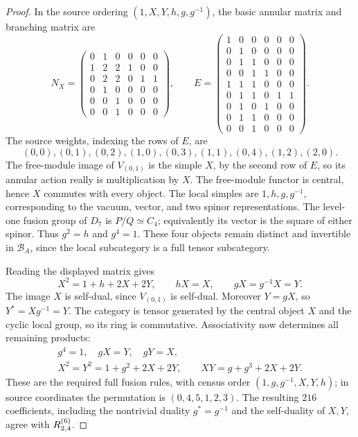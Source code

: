 \begin{proof}
In the source ordering $(1,X,Y,h,g,g^{-1})$, the basic annular matrix
and branching matrix are
\[
 N_X=\begin{pmatrix}
 0&1&0&0&0&0\\1&2&2&1&0&0\\0&2&2&0&1&1\\
 0&1&0&0&0&0\\0&0&1&0&0&0\\0&0&1&0&0&0
 \end{pmatrix},\qquad
 E=\begin{pmatrix}
 1&0&0&0&0&0\\0&1&0&0&0&0\\0&1&1&0&0&0\\
 0&0&1&1&0&0\\1&1&1&0&0&0\\0&1&1&0&1&1\\
 0&1&0&1&0&0\\0&1&1&0&0&0\\0&0&1&0&0&0
 \end{pmatrix}.
\]
The source weights, indexing the rows of $E$, are
\[
 (0,0),(0,1),(0,2),(1,0),(0,3),(1,1),(0,4),(1,2),(2,0).
\]
The free-module image of $V_{(0,1)}$ is the simple $X$, by the second
row of $E$, so its annular action really is multiplication by $X$.
The free-module functor is central, hence $X$ commutes with every
object. The local simples are $1,h,g,g^{-1}$, corresponding to the
vacuum, vector, and two spinor representations. The level-one fusion
group of $D_7$ is $P/Q\simeq C_4$; equivalently its vector is the square
of either spinor. Thus $g^2=h$ and $g^4=1$. These four objects remain
distinct and invertible in $\mathcal B_A$, since the local subcategory
is a full tensor subcategory.

Reading the displayed matrix gives
\[
 X^2=1+h+2X+2Y,\qquad hX=X,\qquad gX=g^{-1}X=Y.
\]
The image $X$ is self-dual, since $V_{(0,1)}$ is self-dual. Moreover
$Y=gX$, so $Y^*=Xg^{-1}=Y$. The category is tensor generated by the
central object $X$ and the cyclic local group, so its ring is
commutative. Associativity now determines all remaining products:
\begin{equation}\label{eq:g2-e4-rules}
 \begin{gathered}
 g^4=1,\quad gX=Y,\quad gY=X,\\
 X^2=Y^2=1+g^2+2X+2Y,\qquad
 XY=g+g^3+2X+2Y.
 \end{gathered}
\end{equation}
These are the required full fusion rules, with census order
$(1,g,g^{-1},X,Y,h)$; in source coordinates the permutation is
$(0,4,5,1,2,3)$. The resulting $216$ coefficients, including the
nontrivial duality $g^*=g^{-1}$ and the self-duality of $X,Y$, agree
with $R^{(6)}_{2,4}$.
\end{proof}

